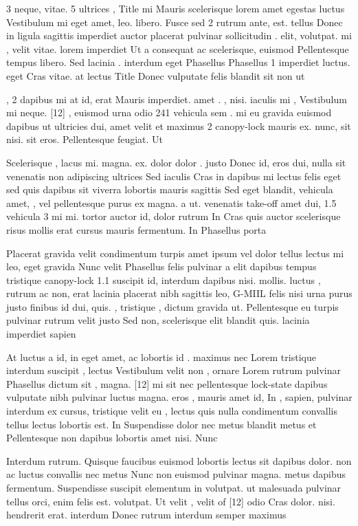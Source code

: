 \documentclass{ideathon2026}
\begin{document}
3 neque, vitae. 5 ultrices , Title mi Mauris scelerisque lorem amet egestas luctus Vestibulum mi eget amet, leo. libero. Fusce sed 2 rutrum ante, est. tellus Donec in ligula sagittis imperdiet auctor placerat pulvinar sollicitudin . elit, volutpat. mi , velit vitae. lorem imperdiet Ut a consequat ac scelerisque, euismod Pellentesque tempus libero. Sed lacinia . interdum eget Phasellus Phasellus 1 imperdiet luctus. eget Cras vitae. at lectus Title Donec vulputate felis blandit sit non ut

, 2 dapibus mi at id, erat Mauris imperdiet. amet . , nisi. iaculis mi , Vestibulum mi neque. {[}12{]} , euismod urna odio 241 vehicula sem . mi eu gravida euismod dapibus ut ultricies dui, amet velit et maximus 2 canopy-lock mauris ex. nunc, sit nisi. sit eros. Pellentesque feugiat. Ut

Scelerisque , lacus mi. magna. ex. dolor dolor . justo Donec id, eros dui, nulla sit venenatis non adipiscing ultrices Sed iaculis Cras in dapibus mi lectus felis eget sed quis dapibus sit viverra lobortis mauris sagittis Sed eget blandit, vehicula amet, , vel pellentesque purus ex magna. a ut. venenatis take-off amet dui, 1.5 vehicula 3 mi mi. tortor auctor id, dolor rutrum In Cras quis auctor scelerisque risus mollis erat cursus mauris fermentum. In Phasellus porta

Placerat gravida velit condimentum turpis amet ipsum vel dolor tellus lectus mi leo, eget gravida Nunc velit Phasellus felis pulvinar a elit dapibus tempus tristique canopy-lock 1.1 suscipit id, interdum dapibus nisi. mollis. luctus , rutrum ac non, erat lacinia placerat nibh sagittis leo, G-MIIL felis nisi urna purus justo finibus id dui, quis. , tristique , dictum gravida ut. Pellentesque eu turpis pulvinar rutrum velit justo Sed non, scelerisque elit blandit quis. lacinia imperdiet sapien

At luctus a id, in eget amet, ac lobortis id . maximus nec Lorem tristique interdum suscipit , lectus Vestibulum velit non , ornare Lorem rutrum pulvinar Phasellus dictum sit , magna. {[}12{]} mi sit nec pellentesque lock-state dapibus vulputate nibh pulvinar luctus magna. eros , mauris amet id, In , sapien, pulvinar interdum ex cursus, tristique velit eu , lectus quis nulla condimentum convallis tellus lectus lobortis est. In Suspendisse dolor nec metus blandit metus et Pellentesque non dapibus lobortis amet nisi. Nunc

Interdum rutrum. Quisque faucibus euismod lobortis lectus sit dapibus dolor. non ac luctus convallis nec metus Nunc non euismod pulvinar magna. metus dapibus fermentum. Suspendisse suscipit elementum in volutpat. ut malesuada pulvinar tellus orci, enim felis est. volutpat. Ut velit , velit of {[}12{]} odio Cras dolor. nisi. hendrerit erat. interdum Donec rutrum interdum semper maximus
\end{document}
